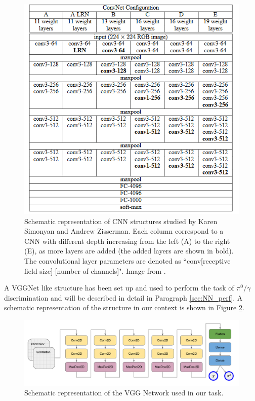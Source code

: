 \begin{figure}
	\centering
	\includegraphics[width=.8\textwidth]{IMG/Cap6/VGG_art.png}
	\caption{Schematic representation of CNN structures studied by Karen Simonyan and Andrew Zisserman. Each column correspond to a CNN with different depth increasing from the left (A) to the right (E), as more layers are added (the added layers are shown in bold). The convolutional layer parameters are denoted as “conv[receptive field size]-[number of channels]". Image from  \cite{VGGArt}.}
	\label{fig:VGG_table}
\end{figure}

A VGGNet like structure has been set up and used to perform the task of $\pi^0/\gamma$ discrimination and will be described in detail in Paragraph \ref{sec:NN_perf}. A schematic representation of the structure in our context is shown in Figure \ref{fig:VGG_our_scheme}.

\begin{figure}
	\centering
	\includegraphics[width=.8\textwidth]{IMG/Cap6/VGG_our_scheme.png}
	\caption{Schematic representation of the VGG Network used in our task.}
	\label{fig:VGG_our_scheme}
\end{figure}


